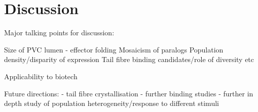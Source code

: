 \pagestyle{IHA-fancy-style}


\chapter{Discussion}\label{Discussion}

Major talking points for discussion:

Size of PVC lumen - effector folding
Mosaicism of paralogs
Population density/disparity of expression
Tail fibre binding candidates/role of diversity etc

Applicability to biotech


Future directions:
	- tail fibre crystallisation
	- further binding studies
	- further in depth study of population heterogeneity/response to different stimuli
